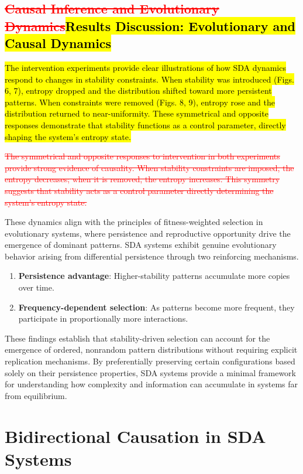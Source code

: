 \documentclass[preprint,12pt]{elsarticle}
\newcommand{\added}[1]{\hl{#1}}
\newcommand{\deleted}[1]{\textcolor{red}{\sout{#1}}}
\begin{document}
\subsection{\deleted{Causal Inference and Evolutionary Dynamics}\added{Results Discussion: Evolutionary and Causal Dynamics}}

\added{The intervention experiments provide clear illustrations of how SDA dynamics
respond to changes in stability constraints. When stability was introduced
(Figs. 6, 7), entropy dropped and the
distribution shifted toward more persistent patterns. When constraints were
removed (Figs. 8, 9), entropy rose and
the distribution returned to near-uniformity. These symmetrical and opposite
responses demonstrate that stability functions as a control parameter,
directly shaping the system's entropy state.
}

\deleted{
The symmetrical and opposite responses to intervention in both experiments provide strong evidence of causality. When stability constraints are imposed, the entropy decreases; when it is removed, the entropy increases. This symmetry suggests that stability acts as a control parameter directly determining the system's entropy state.
}

These dynamics align with the principles of fitness-weighted selection in evolutionary systems, where persistence and reproductive opportunity drive the emergence of dominant patterns. SDA systems exhibit genuine evolutionary behavior arising from differential persistence through two reinforcing mechanisms.
\begin{enumerate}
    \item \textbf{Persistence advantage}: Higher-stability patterns accumulate more copies over time.
    \item \textbf{Frequency-dependent selection}: As patterns become more frequent, they participate in proportionally more interactions.
\end{enumerate}

These findings establish that stability-driven selection can account for the emergence of ordered, nonrandom pattern distributions without requiring explicit replication mechanisms. By preferentially preserving certain configurations based solely on their persistence properties, SDA systems provide a minimal framework for understanding how complexity and information can accumulate in systems far from equilibrium.


\section{Bidirectional Causation in SDA Systems}
\end{document}
